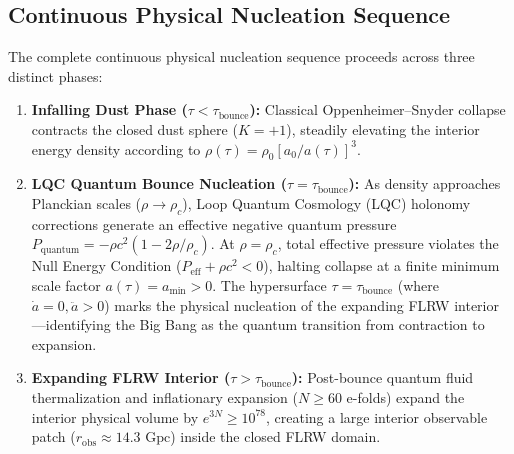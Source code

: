 \documentclass[11pt,a4paper]{article}
\begin{document}
\subsection{Continuous Physical Nucleation Sequence}\label{sec:nucleation}
The complete continuous physical nucleation sequence proceeds across three distinct phases:
\begin{enumerate}
    \item \textbf{Infalling Dust Phase ($\tau < \tau_{\text{bounce}}$):} Classical Oppenheimer--Snyder collapse contracts the closed dust sphere ($K = +1$), steadily elevating the interior energy density according to $\rho(\tau) = \rho_0 [a_0 / a(\tau)]^3$.
    \item \textbf{LQC Quantum Bounce Nucleation ($\tau = \tau_{\text{bounce}}$):} As density approaches Planckian scales ($\rho \to \rho_c$), Loop Quantum Cosmology (LQC) holonomy corrections generate an effective negative quantum pressure $P_{\text{quantum}} = -\rho c^2 (1 - 2\rho/\rho_c)$. At $\rho = \rho_c$, total effective pressure violates the Null Energy Condition ($P_{\text{eff}} + \rho c^2 < 0$), halting collapse at a finite minimum scale factor $a(\tau) = a_{\text{min}} > 0$. The hypersurface $\tau = \tau_{\text{bounce}}$ (where $\dot{a} = 0, \ddot{a} > 0$) marks the physical nucleation of the expanding FLRW interior---identifying the Big Bang as the quantum transition from contraction to expansion.
    \item \textbf{Expanding FLRW Interior ($\tau > \tau_{\text{bounce}}$):} Post-bounce quantum fluid thermalization and inflationary expansion ($N \ge 60$ e-folds) expand the interior physical volume by $e^{3N} \ge 10^{78}$, creating a large interior observable patch ($r_{\text{obs}} \approx 14.3 \text{ Gpc}$) inside the closed FLRW domain.
\end{enumerate}
\end{document}
